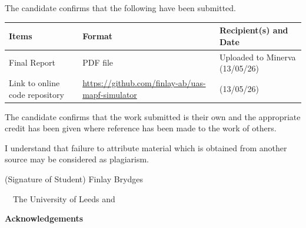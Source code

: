 \frontcover

\clearpage

\noindent The candidate confirms that the following have been submitted.\\


\begin{table}[ht!]
\begin{tabular}{|p{}|p{}|p{}|}
\hline 
Items & Format & Recipient(s) and Date \\ 
\hline 
Final Report & PDF file & Uploaded to Minerva (13/05/26) \\ 
\hline 
Link to online code repository & \url{https://github.com/finlay-ab/uas-mapf-simulator} &  (13/05/26) \\ 
\hline 
\end{tabular} 
\end{table}


\vfill

\noindent The candidate confirms that the work submitted is their own and the appropriate credit has been given where reference has been made to the work of others.

\vfill

\noindent I understand that failure to attribute material which is obtained from another source may be considered as plagiarism.

\vfill

\flushright(Signature of Student) Finlay Brydges
\flushleft

\vfill

\textcopyright~\session~The University of Leeds and~\fullname

\begin{dissertationsummary}

\end{dissertationsummary}

\clearpage
\centering\textbf{Acknowledgements}
\flushleft


\tableofcontents

\clearpage

